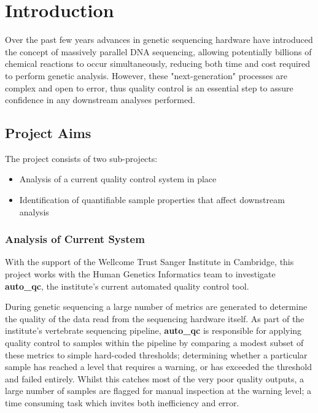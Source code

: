 \chapter{Introduction}
\ifpdf
    \graphicspath{{Chapter1/Figs/Raster/}{Chapter1/Figs/PDF/}{Chapter1/Figs/}}
\else
    \graphicspath{{Chapter1/Figs/Vector/}{Chapter1/Figs/}}
\fi


Over the past few years advances in genetic sequencing hardware have introduced
the concept of massively parallel DNA sequencing, allowing potentially billions
of chemical reactions to occur simultaneously, reducing both time and cost
required to perform genetic analysis\citep{HMG}. However, these
"next-generation" processes are complex and open to error\citep{Illumina}, thus
quality control is an essential step to assure confidence in any downstream
analyses performed.

\section{Project Aims}

The project consists of two sub-projects:

\begin{itemize}
    \item Analysis of a current quality control system in place
    \item Identification of quantifiable sample properties that affect downstream analysis
\end{itemize}


\subsection{Analysis of Current System}
\label{sec:intro-part1}

With the support of the Wellcome Trust Sanger Institute in Cambridge, this
project works with the Human Genetics Informatics team to investigate
\textbf{auto\_qc}\citep{github:autoqc}, the institute's current automated
quality control tool.

During genetic sequencing a large number of metrics are generated to determine
the quality of the data read from the sequencing hardware itself. As part of the
institute's vertebrate sequencing pipeline\citep{github:vr-pipe},
\textbf{auto\_qc} is responsible for applying quality control to samples within
the pipeline by comparing a modest subset of these metrics to simple hard-coded
thresholds; determining whether a particular sample has reached a level that
requires a warning, or has exceeded the threshold and failed entirely. Whilst
this catches most of the very poor quality outputs, a large number of samples
are flagged for manual inspection at the warning level; a time consuming task
which invites both inefficiency and error\citep{marireport}.

